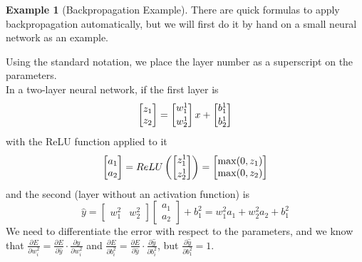 \documentclass[a4paper]{article}
\theoremstyle{definition}
\newtheorem{example}{Example}
\begin{document}
\begin{example}[Backpropagation Example]
    There are quick formulas to apply backpropagation automatically, but we will first do it by hand on a small neural network as an example.
    
    \noindent
    Using the standard notation, we place the layer number as a superscript on the parameters.\\
    In a two-layer neural network, if the first layer is 
    \begin{equation}
        \begin{bmatrix} z_1\\ z_2 \end{bmatrix} = \begin{bmatrix} w^{1}_{1} \vspace{2pt}\\ w^{1}_{2} \end{bmatrix} x + \begin{bmatrix} b^{1}_1 \vspace{2pt}\\ b^{1}_2 \end{bmatrix}
    \end{equation}
    with the ReLU function applied to it
    \begin{equation}
        \begin{bmatrix} a_1\\ a_2 \end{bmatrix} = ReLU\left(\begin{bmatrix} z^1_1 \vspace{2pt}\\ z^1_2 \end{bmatrix}\right) = \begin{bmatrix} \max(0, z_1)\\ \max(0, z_2) \end{bmatrix}
    \end{equation}
    and the second (layer without an activation function) is
    \begin{equation}
        \hat{y} = \begin{bmatrix} w^{2}_{1} & w^{2}_{2} \end{bmatrix} \begin{bmatrix} a_1\\ a_2 \end{bmatrix} + b^{2}_1 = w^{2}_{1} a_1 + w^{2}_{2} a_2 + b^{2}_1
    \end{equation}
    We need to differentiate the error with respect to the parameters, and we know that $\frac{\partial E}{\partial w^2_i} = \frac{\partial E}{\partial \hat{y}} \cdot \frac{\partial \hat{y}}{\partial w^2_i}$ and $\frac{\partial E}{\partial b^2_i} = \frac{\partial E}{\partial \hat{y}} \cdot \frac{\partial \hat{y}}{\partial b^2_i}$, but $\frac{\partial \hat{y}}{\partial b^2_1} = 1$.\\

\end{example}
\end{document}
